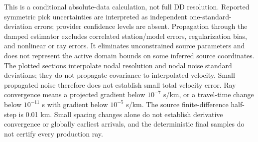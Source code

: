 This is a conditional absolute-data calculation, not full DD resolution. Reported symmetric pick uncertainties are interpreted as independent one-standard-deviation errors; provider confidence levels are absent. Propagation through the damped estimator excludes correlated station/model errors, regularization bias, and nonlinear or ray errors. It eliminates unconstrained source parameters and does not represent the active domain bounds on some inferred source coordinates. The plotted sections interpolate nodal resolution and nodal noise standard deviations; they do not propagate covariance to interpolated velocity. Small propagated noise therefore does not establish small total velocity error. Ray convergence means a projected gradient below $10^{-7}$ s/km, or a travel-time change below $10^{-11}$ s with gradient below $10^{-5}$ s/km. The source finite-difference half-step is 0.01 km. Small spacing changes alone do not establish derivative convergence or globally earliest arrivals, and the deterministic final samples do not certify every production ray.
